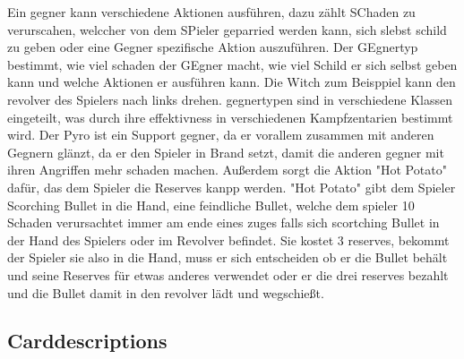 Ein gegner kann verschiedene Aktionen ausführen, dazu zählt SChaden zu verurscahen, welccher von dem SPieler geparried werden kann,
sich slebst schild zu geben oder eine Gegner spezifische Aktion auszuführen. Der GEgnertyp bestimmt, wie viel schaden der
GEgner macht, wie viel Schild er sich selbst geben kann und welche Aktionen er ausführen kann. Die Witch zum Beisppiel
kann den revolver des Spielers nach links drehen. gegnertypen sind in verschiedene Klassen eingeteilt, was durch ihre
effektivness in verschiedenen Kampfzentarien bestimmt wird. Der Pyro ist ein Support gegner, da er vorallem zusammen mit
anderen Gegnern glänzt, da er den Spieler in Brand setzt, damit die anderen gegner mit ihren Angriffen mehr schaden machen.
Außerdem sorgt die Aktion "Hot Potato" dafür, das dem Spieler die Reserves kanpp werden. "Hot Potato" gibt dem Spieler
Scorching Bullet in die Hand, eine feindliche Bullet, welche dem spieler 10 Schaden verursachtet immer am ende eines zuges
falls sich scortching Bullet in der Hand des Spielers oder im Revolver befindet. Sie kostet 3 reserves, bekommt der Spieler
sie also in die Hand, muss er sich entscheiden ob er die Bullet behält und seine Reserves für etwas anderes verwendet oder
er die drei reserves bezahlt und die Bullet damit in den revolver lädt und wegschießt.










\subsection{Carddescriptions}\label{subsec:placementMatters}

